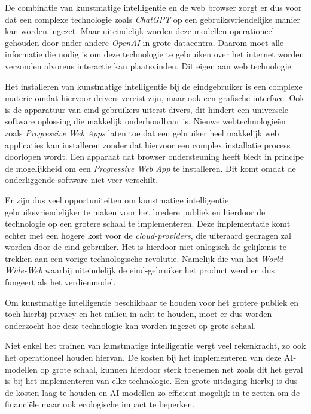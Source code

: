\bigbreak{}

De combinatie van kunstmatige intelligentie en de web browser zorgt er dus voor dat een complexe technologie zoals \textit{ChatGPT} op een gebruiksvriendelijke manier kan worden ingezet. Maar uiteindelijk worden deze modellen operationeel gehouden door onder andere \textit{OpenAI} in grote datacentra. Daarom moet alle informatie die nodig is om deze technologie te gebruiken over het internet worden verzonden alvorens interactie kan plaatsvinden. Dit eigen aan web technologie.

\bigbreak{}

Het installeren van kunstmatige intelligentie bij de eindgebruiker is een complexe materie omdat hiervoor drivers vereist zijn, maar ook een grafische interface. Ook is de apparatuur van eind-gebruikers uiterst divers, dit hindert een universele software oplossing die makkelijk onderhoudbaar is. Nieuwe webtechnologieën zoals \textit{Progressive Web Apps} laten toe dat een gebruiker heel makkelijk web applicaties kan installeren zonder dat hiervoor een complex installatie process doorlopen wordt. Een apparaat dat browser ondersteuning heeft biedt in principe de mogelijkheid om een \textit{Progressive Web App} te installeren. Dit komt omdat de onderliggende software niet veer verschilt.

\break{}

Er zijn dus veel opportuniteiten om kunstmatige intelligentie gebruiksvriendelijker te maken voor het bredere publiek en hierdoor de technologie op een grotere schaal te implementeren. Deze implementatie komt echter met een hogere kost voor de \textit{cloud-providers}, die uiteraard gedragen zal worden door de eind-ge\-brui\-ker. Het is hierdoor niet onlogisch de gelijkenis te trekken aan een vorige technologische revolutie. Namelijk die van het \textit{World-Wide-Web} waarbij uiteindelijk de eind-gebruiker het product werd en dus fungeert als het verdienmodel.

\bigbreak{}

Om kunstmatige intelligentie beschikbaar te houden voor het grotere publiek en toch hierbij privacy en het milieu in acht te houden, moet er dus worden onderzocht hoe deze technologie kan worden ingezet op grote schaal.

\bigbreak{}

Niet enkel het trainen van kunstmatige intelligentie vergt veel rekenkracht, zo ook het operationeel houden hiervan. De kosten bij het implementeren van deze AI-modellen op grote schaal, kunnen hierdoor sterk toenemen net zoals dit het geval is bij het implementeren van elke technologie. Een grote uitdaging hierbij is dus de kosten laag te houden en AI-modellen zo efficient mogelijk in te zetten om de financiële maar ook ecologische impact te beperken.

